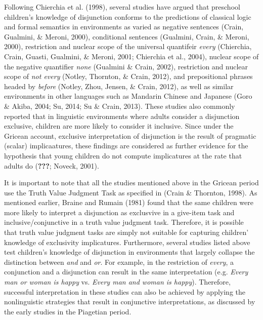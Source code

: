 \documentclass[floatsintext,man]{apa6}
\theoremstyle{definition}
\theoremstyle{definition}
\theoremstyle{definition}
\theoremstyle{remark}
\begin{document}
Following Chierchia et al. (1998), several studies have argued that
preschool children's knowledge of disjunction conforms to the
predictions of classical logic and formal semantics in environments as
varied as negative sentences (Crain, Gualmini, \& Meroni, 2000),
conditional sentences (Gualmini, Crain, \& Meroni, 2000), restriction
and nuclear scope of the universal quantifeir \emph{every} (Chierchia,
Crain, Guasti, Gualmini, \& Meroni, 2001; Chierchia et al., 2004),
nuclear scope of the negative quantifier \emph{none} (Gualmini \& Crain,
2002), restriction and nuclear scope of \emph{not every} (Notley,
Thornton, \& Crain, 2012), and prepositional phrases headed by
\emph{before} (Notley, Zhou, Jensen, \& Crain, 2012), as well as similar
environments in other languages such as Mandarin Chinese and Japanese
(Goro \& Akiba, 2004; Su, 2014; Su \& Crain, 2013). These studies also
commonly reported that in linguistic environments where adults consider
a disjunction exclusive, children are more likely to consider it
inclusive. Since under the Gricean account, exclusive interpretation of
disjunction is the result of pragmatic (scalar) implicaatures, these
findings are considered as further evidence for the hypothesis that
young children do not compute implicatures at the rate that adults do
({\textbf{???}}; Noveck, 2001).

It is important to note that all the studies mentioned above in the
Gricean period use the Truth Value Judgment Task as specified in (Crain
\& Thornton, 1998). As mentioned earlier, Braine and Rumain (1981) found
that the same children were more likely to interpret a disjunction as
exclusvive in a give-item task and inclusive/conjunctive in a truth
value judgment task. Therefore, it is possible that truth value judgment
tasks are simply not suitable for capturing children' knowledge of
exclusivity implicatures. Furthermore, several studies listed above test
children's knowledge of disjunction in environments that largely
collapse the distinction between \emph{and} and \emph{or}. For example,
in the restriction of \emph{every}, a conjunction and a disjunction can
result in the same interpretation (e.g. \emph{Every man or woman is
happy} vs. \emph{Every man and woman is happy}). Therefore, successful
interpretation in these studies can also be achieved by applying the
nonlinguistic strategies that result in conjunctive interpretations, as
discussed by the early studies in the Piagetian period.
\end{document}
